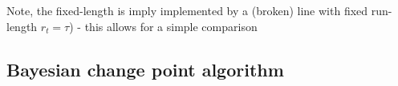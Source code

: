 \documentclass[profile,final,english, draft]{article}%
\begin{document}
Note, the fixed-length is imply implemented by a (broken) line with fixed run-length $r_t=\tau$) - this allows for a simple comparison

\subsection{Bayesian change point algorithm}


%
\end{document}
